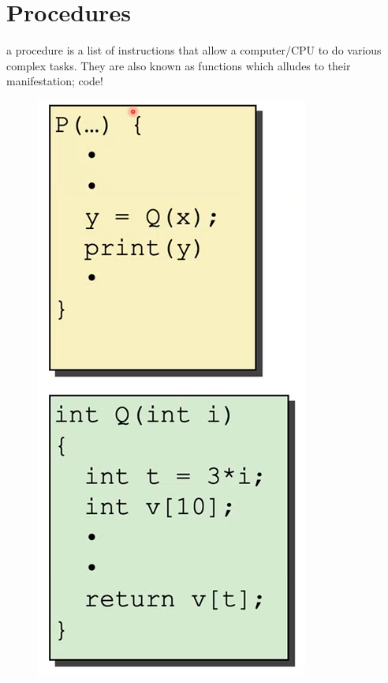 \documentclass[12pt]{book}
\title{\coursetitle\linebreak\lecturename}
\author{\\Cain Susko\\ 
           \\ \\ \\
      Queen's University 
    \\School of Computing\\}
\begin{document}
\begin{titlepage}
        \maketitle
\end{titlepage}


\section*{Procedures}
a procedure is a list of instructions that allow a computer/CPU to do various complex tasks. They are also known as 
        functions which alludes to their manifestation; code!

\begin{figure}[h]
        \centering
        \includegraphics[scale = 0.5]{./figures/procedureEx}
        
\end{figure}
\end{document}
